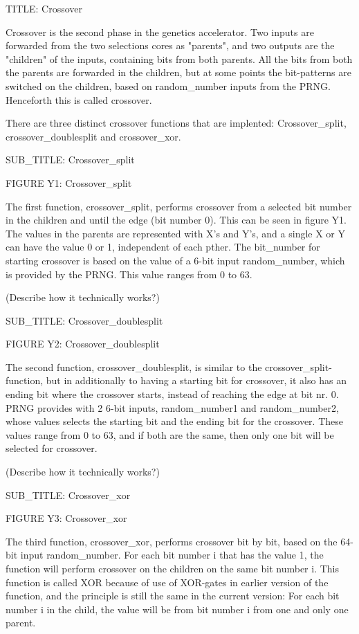 TITLE: Crossover

Crossover is the second phase in the genetics accelerator. Two inputs are forwarded from the two selections cores as "parents", and two outputs are the "children" of the inputs, containing bits from both parents. All the bits from both the parents are forwarded in the children, but at some points the bit-patterns are switched on the children, based on random\_number inputs from the PRNG. Henceforth this is called crossover.

There are three distinct crossover functions that are implented: Crossover\_split, crossover\_doublesplit and crossover\_xor.

SUB\_TITLE: Crossover\_split 

FIGURE Y1: Crossover\_split

The first function, crossover\_split, performs crossover from a selected bit number in the children and until the edge (bit number 0). This can be seen in figure Y1. The values in the parents are represented with X's and Y's, and a single X or Y can have the value 0 or 1, independent of each pther.
The bit\_number for starting crossover is based on the value of a 6-bit input random\_number, which is provided by the PRNG. This value ranges from 0 to 63.

(Describe how it technically works?)

SUB\_TITLE: Crossover\_doublesplit

FIGURE Y2: Crossover\_doublesplit

The second function, crossover\_doublesplit, is similar to the crossover\_split-function, but in additionally to having a starting bit for crossover, it also has an ending bit where the crossover starts, instead of reaching the edge at bit nr. 0. PRNG provides with 2 6-bit inputs, random\_number1 and random\_number2, whose values selects the starting bit and the ending bit for the crossover. These values range from 0 to 63, and if both are the same, then only one bit will be selected for crossover.

(Describe how it technically works?)

SUB\_TITLE: Crossover\_xor

FIGURE Y3:  Crossover\_xor

The third function, crossover\_xor, performs crossover bit by bit, based on the 64-bit input random\_number. For each bit number i that has the value 1, the function will perform crossover on the children on the same bit number i. This function is called XOR because of use of XOR-gates in earlier version of the function, and the principle is still the same in the current version: For each bit number i in the child, the value will be from bit number i from one and only one parent.

